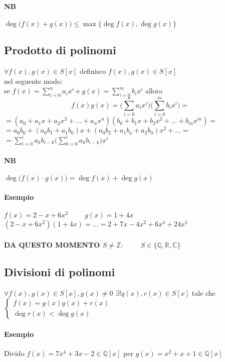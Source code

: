     \paragraph{NB} $\deg \big(f(x)+g(x)\big)\leq \max\{\deg f(x),\deg g(x)\}$
    \subsection{Prodotto di polinomi}
        $\forall f(x),g(x)\in S[x]$ definisco $f(x),g(x)\in S[x]$\\
    nel seguente modo:\\
    se $f(x)=\sum_{i=0}^{n}a_ix^i$ e $g(x)=\sum_{i=0}^{m}b_ix^i$ allora
            $$f(x)g(x)=\Bigg( \sum_{i=0}^{n}a_ix^i\Bigg)\Bigg(\sum_{i=0}^{m}b_ix^i\Bigg)=$$
    $=(a_0+a_1x+a_2x^2+...+a_nx^n)(b_0+b_1x+b_2x^2+...+b_mx^m)=$\\
    $=a_0b_0+(a_0b_1+a_1b_0)x+(a_0b_2+a_1b_a+a_2b_0)x^2+... =$
    $=\sum_{i=0}^{i}a_kb_{i-k}\Bigg(\sum_{k=0}^{i} a_kb_{i-k}\Bigg)x^i$
    \paragraph{NB} $\deg \big(f(x)\cdot g(x)\big)=\deg f(x)+\deg g(x)$
    \paragraph{Esempio} $f(x)=2-x+6x^2\hspace{1cm} g(x)=1+4x$\\
        $(2-x+6x^2)(1+4x)=...=2+7x-4x^2+6x^4+24x^5$\\\\
    \textbf{DA QUESTO MOMENTO $S\neq \mathbb{Z}: \hspace{1cm} S\in
    \{\mathbb{Q},\mathbb{R},\mathbb{C} \}$}
    \subsection{Divisioni di polinomi}
    $\forall f(x),g(x)\in S[x], g(x)\neq 0$
    $\exists! q(x),r(x)\in S[x]$ tale che 
    $
    \begin{cases}
        f(x)=g(x)q(x)+r(x)\\
        \deg r (x) < \deg g(x)
    \end{cases}
    $
    \paragraph{Esempio} Divido $f(x)=7x^4+3x-2\in\mathbb{Q}[x]$ per $g(x)=x^2+x+1\in\mathbb{Q}[x]$\\
    \par
